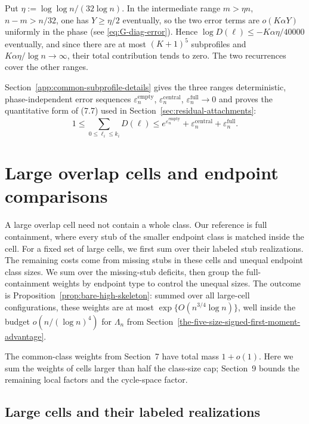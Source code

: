 \documentclass[a4paper,10pt,reqno]{amsart}
\numberwithin{equation}{section}
\theoremstyle{plain}
\theoremstyle{remark}
\begin{document}
Put $\eta:=\log\log n/(32\log n)$. In the intermediate range $m>\eta n$,
$n-m>n/32$, one has $Y\ge\eta/2$ eventually, so the two error terms are
$o(K\alpha Y)$ uniformly in the phase (see \eqref{eq:G-diag-error}). Hence
$\log D(\ell)\le-K\alpha\eta/40000$ eventually, and since there are at most
$(K+1)^5$ subprofiles and $K\alpha\eta/\log n\to\infty$, their total
contribution tends to zero. The two recurrences cover the other ranges.

Section~\ref{app:common-subprofile-details} gives the three ranges
deterministic, phase-independent error sequences
$\varepsilon_n^{\mathrm{empty}}$, $\varepsilon_n^{\mathrm{central}}$,
$\varepsilon_n^{\mathrm{full}}\to0$ and proves the quantitative form of (7.7)
used in Section~\ref{sec:residual-attachments}:
\begin{equation*}
  1\le\sum_{0\le\ell_i\le k_i}D(\ell)
  \le e^{\varepsilon_n^{\mathrm{empty}}}+\varepsilon_n^{\mathrm{central}}
     +\varepsilon_n^{\mathrm{full}}.
  \tag{7.7a}\label{eq:common-subprofile-quantitative}
\end{equation*}

\section{Large overlap cells and endpoint comparisons}
\label{sec:canonical-high-cells}

A large overlap cell need not contain a whole class. Our reference is
full containment, where every stub of the smaller endpoint class is
matched inside the cell. For a fixed set of large cells, we first sum over
their labeled stub realizations. The remaining costs come from missing
stubs in these cells and unequal endpoint class sizes. We sum over the
missing-stub deficits, then group the full-containment weights by endpoint
type to control the unequal sizes.
The outcome is Proposition~\ref{prop:bare-high-skeleton}: summed over all
large-cell configurations, these weights are at most
$\exp\{O(n^{3/4}\log n)\}$, well inside the budget $o(n/(\log n)^4)$ for
$\Lambda_n$ from Section~\ref{the-five-size-signed-first-moment-advantage}.

The common-class weights from Section~7 have total mass $1+o(1)$.
Here we sum the weights of cells larger than half the class-size cap;
Section~9 bounds the remaining local factors and the cycle-space factor.



\subsection{Large cells and their labeled realizations}
\label{subsec:large-cell-realizations}
\end{document}
